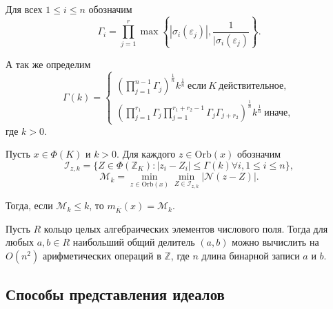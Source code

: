 \documentclass[_00_dissertation.tex]{subfiles}
\begin{document}
\begin{definition}
    Для всех $1 \le i \le n$ обозначим
    \begin{equation*}
        \Gamma_i = \prod\limits_{j=1}^r \max\left\{
            |\sigma_i(\varepsilon_j)|, \frac{1}{|\sigma_i(\varepsilon_j)}
        \right\}.
    \end{equation*}

    А так же определим
    \begin{equation*}
        \Gamma(k) =
        \begin{cases}
            \left(
                \prod\limits_{j=1}^{n-1} \Gamma_j
            \right)^{\frac{1}{n}} k^{\frac{1}{n}}\ \textrm{если}\ K\ \textrm{действительное},\\
            \left(
                \prod\limits_{j=1}^{r_1} \Gamma_j \prod\limits_{j=1}^{r_1+r_2-1} \Gamma_j \Gamma_{j+r_2}
            \right)^{\frac{1}{n}} k^{\frac{1}{n}}\ \textrm{иначе},
        \end{cases}
    \end{equation*}
    где $k>0$.
\end{definition}

\begin{proposition}\label{proposition:division_with_least_norm_remainder}\cite{source:Lezowski}
    Пусть $x \in \Phi(K)$ и $k > 0$.
    Для каждого $z \in \textrm{Orb}(x)$ обозначим
    \begin{equation*}
        \mathcal{I}_{z, k} = \{Z \in \Phi(\mathbb{Z}_K): |z_i-Z_i| \le \Gamma(k) \forall i, 1 \le i \le n\},
    \end{equation*}
    \begin{equation*}
        \mathcal{M}_k = \min\limits_{z \in \textrm{Orb}(x)} \min\limits_{Z \in \mathcal{I}_{z, k}} |\mathcal{N}(z-Z)|.
    \end{equation*}

    Тогда, если $\mathcal{M}_k \le k$, то $m_{\overline{K}}(x) = \mathcal{M}_k$.
\end{proposition}

\begin{statement}\cite{source:Wikstrom}
    Пусть $R$ кольцо целых алгебраических элементов числового поля.
    Тогда для любых $a, b \in R$ наибольший общий делитель $(a, b)$ можно вычислить на $O(n^2)$ арифметических операций в $\mathbb{Z}$, где $n$ длина бинарной записи $a$ и $b$.
\end{statement}

\subsection{Способы представления идеалов}
\end{document}
